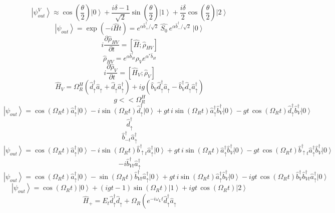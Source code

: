 \documentclass[12pt]{article}
\begin{document}
\begin{large}
\[
    \left| \psi_{out}^V \right> \approx \cos \left( \frac{\theta }{2} \right) \left| 0 \right> + \frac{i \delta - 1}{\sqrt{2}} \sin \left( \frac{\theta}{2} \right) \left| 1 \right> + \frac{i \delta}{2} \cos \left( \frac{\theta}{2} \right) \left| 2 \right>
\]
\[
    \left| \psi_{out} \right> = \exp\left( -i \hat{H} t \right)  =  e^{\alpha \hat{b}^{\dag}_{+} / \sqrt{2}} \ \hat{S_0}  \ e^{\alpha \hat{b}^{\dag}_{-} / \sqrt{2}} \ \left| 0 \right>
\]
\[
    i \frac{\partial \hat{\rho}_{HV} }{\partial t} = \left[ \hat{H} ; \hat{\rho}_{HV} \right]
\]
\[
     \hat{\rho}_{HV} = e^{\alpha \hat{b}^{\dag}_{H}}  \hat{\rho}_{V}  e^{\alpha^{*} \hat{b}_{H}}
\]
\[
    i \frac{\partial \hat{\rho}_{V} }{\partial t} = \left[ \hat{H}_V ; \hat{\rho}_{V} \right]
\]
\[
    \hat{H}_V = \Omega_R^{H} \left( \hat{d}^{\dag}_{\uparrow} \hat{a}_{\uparrow}
    + \hat{d}_{\uparrow} \hat{a}^{\dag}_{\uparrow} \right)
    + ig \left( \hat{b}_{V} \hat{d}^{\dag}_{\uparrow} \hat{a}_{\uparrow}
    - \hat{b}^{\dag}_{V} \hat{d}_{\uparrow} \hat{a}^{\dag}_{\uparrow} \right)
\]
\[
    g << \Omega_R^{H}
\]
\[
    \left| \psi_{out} \right> = \cos(\Omega_R t) \hat{a}^{\dag}_{\uparrow} \left| 0 \right>  -i\sin(\Omega_R t) \hat{d}^{\dag}_{\uparrow} \left| 0 \right> + gt \, i\sin(\Omega_R t) \hat{a}^{\dag}_{\uparrow} \hat{b}^{\dag}_{V} \left| 0 \right> - gt \, \cos(\Omega_R t) \hat{d}^{\dag}_{\uparrow} \hat{b}^{\dag}_{V} \left| 0 \right>
\]
\[
    \hat{d}^{\dag}_{\uparrow}
\]
\[
    \hat{b}^{\dag}_{- t} \hat{a}^{\dag}_{\uparrow}
\]
\[
    \left| \psi_{out} \right> = \cos(\Omega_R t) \hat{a}^{\dag}_{\uparrow} \left| 0 \right>  -i\sin(\Omega_R t) \hat{b}^{\dag}_{\uparrow t} \hat{a}^{\dag}_{\uparrow} \left| 0 \right> + gt \, i\sin(\Omega_R t) \hat{a}^{\dag}_{\uparrow} \hat{b}^{\dag}_{V} \left| 0 \right> - gt \, \cos(\Omega_R t) \hat{b}^{\dag}_{\uparrow t} \hat{a}^{\dag}_{\uparrow} \hat{b}^{\dag}_{V} \left| 0 \right>
\]
\[
    -i \hat{b}^{\dag}_{V t} \hat{a}^{\dag}_{\uparrow}
\]
\[
    \left| \psi_{out} \right> = \cos(\Omega_R t) \hat{a}^{\dag}_{\uparrow} \left| 0 \right>  - \sin(\Omega_R t) \hat{b}^{\dag}_{V t} \hat{a}^{\dag}_{\uparrow} \left| 0 \right> + gt \, i\sin(\Omega_R t) \hat{a}^{\dag}_{\uparrow} \hat{b}^{\dag}_{V} \left| 0 \right> - i gt \, \cos(\Omega_R t)  \hat{b}^{\dag}_{V} \hat{b}^{\dag}_{V t} \hat{a}^{\dag}_{\uparrow} \left| 0 \right>
\]
\[
    \left| \psi_{out} \right> = \cos(\Omega_R t) \left| 0 \right>  + (i gt -1) \sin(\Omega_R t) \left| 1 \right> + i gt \, \cos(\Omega_R t)  \left| 2 \right>
\]
\[
    \hat{H}_{+} = E_t \hat{d}^{\dag}_{\uparrow} \hat{d}_{\uparrow}
    + \Omega_R \left( e^{-i \omega_L t} \hat{d}^{\dag}_{\uparrow} \hat{a}_{\uparrow}
\]
\end{large}
\end{document}
